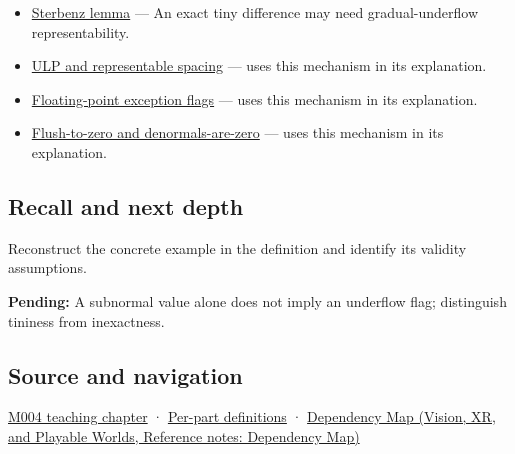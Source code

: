 \hypertarget{appendix-00a6e044c437-used-by}{}

\begin{itemize}
\item
  \hyperref[appendix-399b7ad53f39]{Sterbenz lemma} --- An exact tiny difference may need gradual-underflow representability.
\item
  \hyperref[appendix-14bab4cab9d4]{ULP and representable spacing} --- uses this mechanism in its explanation.
\item
  \hyperref[appendix-ed8531b46754]{Floating-point exception flags} --- uses this mechanism in its explanation.
\item
  \hyperref[appendix-e979eb012782]{Flush-to-zero and denormals-are-zero} --- uses this mechanism in its explanation.
\end{itemize}

\subsection{Recall and next depth}\label{appendix-00a6e044c437-recall-and-next-depth}

\hypertarget{appendix-00a6e044c437-recall-and-next-depth}{}

Reconstruct the concrete example in the definition and identify its validity assumptions.

\textbf{Pending:} A subnormal value alone does not imply an underflow flag; distinguish tininess from inexactness.

\subsection{Source and navigation}\label{appendix-00a6e044c437-source-and-navigation}

\hypertarget{appendix-00a6e044c437-source-and-navigation}{}

\hyperref[01-foundations-i-ch001-a-stretching-ruler-for-real-valued-quantities]{M004 teaching chapter} · \hyperref[appendix-fd090d982a15-m004---parts-61-76]{Per-part definitions} · \href{../07-Vision-XR-and-Playable-Worlds/main.pdf\#nameddest=appendix-4ad47bdd269a}{Dependency Map (Vision, XR, and Playable Worlds, Reference notes: Dependency Map)}
